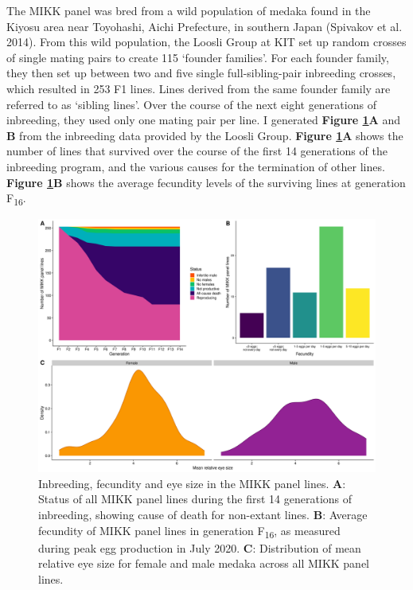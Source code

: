 \documentclass[
]{book}
\begin{document}
The MIKK panel was bred from a wild population of medaka found in the Kiyosu area near Toyohashi, Aichi Prefecture, in southern Japan (Spivakov et al. 2014). From this wild population, the Loosli Group at KIT set up random crosses of single mating pairs to create 115 `founder families'. For each founder family, they then set up between two and five single full-sibling-pair inbreeding crosses, which resulted in 253 F1 lines. Lines derived from the same founder family are referred to as `sibling lines'. Over the course of the next eight generations of inbreeding, they used only one mating pair per line. I generated \textbf{Figure \ref{fig:InbreedingFigure}A} and \textbf{B} from the inbreeding data provided by the Loosli Group. \textbf{Figure \ref{fig:InbreedingFigure}A} shows the number of lines that survived over the course of the first 14 generations of the inbreeding program, and the various causes for the termination of other lines. \textbf{Figure \ref{fig:InbreedingFigure}B} shows the average fecundity levels of the surviving lines at generation F\textsubscript{16}.



\begin{figure}
\includegraphics[width=1\linewidth]{figs/mikk_genome/20211213_final_figure} \caption{Inbreeding, fecundity and eye size in the MIKK panel lines. \textbf{A}: Status of all MIKK panel lines during the first 14 generations of inbreeding, showing cause of death for non-extant lines. \textbf{B}: Average fecundity of MIKK panel lines in generation F\textsubscript{16}, as measured during peak egg production in July 2020. \textbf{C}: Distribution of mean relative eye size for female and male medaka across all MIKK panel lines.}\label{fig:InbreedingFigure}
\end{figure}
\end{document}
